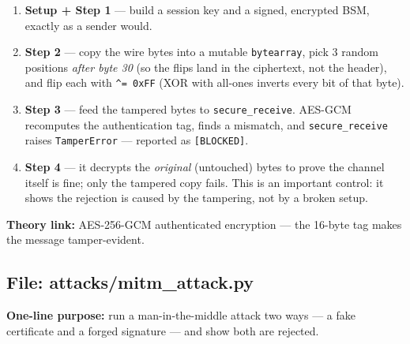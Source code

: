 \documentclass[11pt,a4paper]{report}
\begin{document}
\begin{enumerate}
  \item \textbf{Setup + Step 1} --- build a session key and a signed, encrypted
        BSM, exactly as a sender would.
  \item \textbf{Step 2} --- copy the wire bytes into a mutable \texttt{bytearray},
        pick 3 random positions \emph{after byte 30} (so the flips land in the
        ciphertext, not the header), and flip each with \texttt{\^{}= 0xFF} (XOR
        with all-ones inverts every bit of that byte).
  \item \textbf{Step 3} --- feed the tampered bytes to \texttt{secure\_receive}.
        AES-GCM recomputes the authentication tag, finds a mismatch, and
        \texttt{secure\_receive} raises \texttt{TamperError} --- reported as
        \texttt{[BLOCKED]}.
  \item \textbf{Step 4} --- it decrypts the \emph{original} (untouched) bytes to
        prove the channel itself is fine; only the tampered copy fails. This is
        an important control: it shows the rejection is caused by the tampering,
        not by a broken setup.
\end{enumerate}
\textbf{Theory link:} AES-256-GCM authenticated encryption --- the 16-byte tag
makes the message tamper-evident.

\subsection{File: attacks/mitm\_attack.py}
\textbf{One-line purpose:} run a man-in-the-middle attack two ways --- a fake
certificate and a forged signature --- and show both are rejected.
\end{document}
